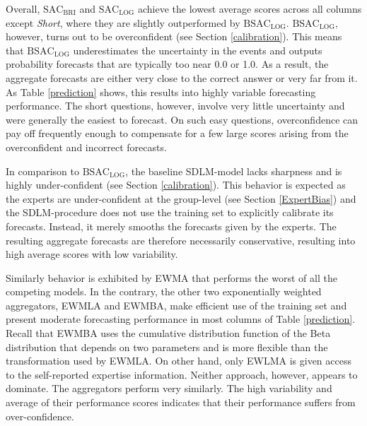 \documentclass[aoas, preprint]{imsart}
\numberwithin{equation}{section}
\theoremstyle{plain}
\begin{document}
Overall, $\text{SAC}_{\text{BRI}}$ and $\text{SAC}_{\text{LOG}}$ achieve the lowest average scores across all columns except \textit{Short}, where they are slightly outperformed by $\text{BSAC}_{\text{LOG}}$.  $\text{BSAC}_{\text{LOG}}$, however, turns out to be overconfident (see Section \ref{calibration}). This means that $\text{BSAC}_{\text{LOG}}$ underestimates the uncertainty in the events and outputs probability forecasts that are typically too near 0.0 or 1.0. As a result, the aggregate forecasts are either very close to the correct answer or very far from it.  As Table \ref{prediction} shows, this results into highly variable forecasting performance. The short questions, however, involve very little uncertainty and were generally the easiest to forecast. On such easy questions, overconfidence can pay off frequently enough to compensate for a few large scores arising from the overconfident and incorrect forecasts. 

In comparison to $\text{BSAC}_{\text{LOG}}$, the baseline SDLM-model lacks sharpness and is highly under-confident (see Section \ref{calibration}). This behavior is expected as the experts are under-confident at the group-level (see Section \ref{ExpertBias}) and the SDLM-procedure does not use the training set to explicitly calibrate its forecasts. Instead, it merely smooths the forecasts given by the experts. The resulting aggregate forecasts are therefore necessarily conservative, resulting into high average scores with low variability. 

 Similarly behavior is exhibited by EWMA that performs the worst of all the competing models. In the contrary, the other two exponentially weighted aggregators, EWMLA and EWMBA, make efficient use of the training set and present moderate forecasting performance in most columns of Table \ref{prediction}. Recall that EWMBA uses the cumulative distribution function of the Beta distribution that depends on two parameters and is more flexible than the transformation used by EWMLA. On other hand, only EWLMA is given access to the self-reported expertise information. Neither approach, however, appears to dominate. The aggregators perform very similarly. The high variability and average of their performance scores indicates that their performance suffers from over-confidence.


\end{document}

